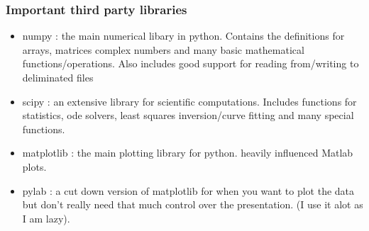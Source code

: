 \documentclass[11pt,a4paper]{article}
\begin{document}
\subsubsection{Important third party libraries}
\begin{itemize}
\item numpy : the main numerical libary in python. Contains the definitions for arrays, matrices complex numbers and many basic mathematical functions/operations. Also includes good support for reading from/writing to deliminated files
\item scipy : an extensive library for scientific computations. Includes functions for statistics, ode solvers, least squares inversion/curve fitting and many special functions.
\item matplotlib : the main plotting library for python. heavily influenced Matlab plots.
\item pylab : a cut down version of matplotlib for when you want to plot the data but don't really need that much control over the presentation. (I use it alot as I am lazy).
\end{itemize}
\end{document}
